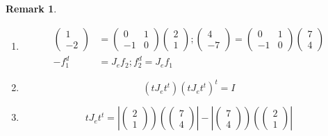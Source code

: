 \documentclass[aps,preprint]{revtex4}
\newtheorem{remark}[theorem]{Remark}
\begin{document}
\begin{remark}
\begin{enumerate}
\item 
\begin{align}
\left( 
\begin{array}{c}
1 \\ 
-2%
\end{array}%
\right) & =\left( 
\begin{array}{cc}
0 & 1 \\ 
-1 & 0%
\end{array}%
\right) \left( 
\begin{array}{c}
2 \\ 
1%
\end{array}%
\right) ;\left( 
\begin{array}{c}
4 \\ 
-7%
\end{array}%
\right) =\left( 
\begin{array}{cc}
0 & 1 \\ 
-1 & 0%
\end{array}%
\right) \left( 
\begin{array}{c}
7 \\ 
4%
\end{array}%
\right) \\
-f_{1}^{d}& =J_{e}f_{2};f_{2}^{d}=J_{e}f_{1}
\end{align}

\item 
\begin{equation}
\left( tJ_{e}t^{t}\right) \left( tJ_{e}t^{t}\right) ^{t}=I
\end{equation}

\item 
\begin{equation}
tJ_{e}t^{t}=\left\vert \left( 
\begin{array}{c}
2 \\ 
1%
\end{array}%
\right) \right) \left( \left( 
\begin{array}{c}
7 \\ 
4%
\end{array}%
\right) \right\vert -\left\vert \left( 
\begin{array}{c}
7 \\ 
4%
\end{array}%
\right) \right) \left( \left( 
\begin{array}{c}
2 \\ 
1%
\end{array}%
\right) \right\vert
\end{equation}


\end{enumerate}
\end{remark}
\end{document}
